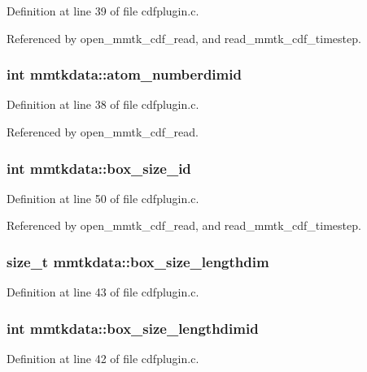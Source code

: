 Definition at line 39 of file cdfplugin.c.

Referenced by open\_\-mmtk\_\-cdf\_\-read, and read\_\-mmtk\_\-cdf\_\-timestep.
\subsubsection{\setlength{\rightskip}{0pt plus 5cm}int mmtkdata::atom\_\-numberdimid}\label{structmmtkdata_m4}




Definition at line 38 of file cdfplugin.c.

Referenced by open\_\-mmtk\_\-cdf\_\-read.
\subsubsection{\setlength{\rightskip}{0pt plus 5cm}int mmtkdata::box\_\-size\_\-id}\label{structmmtkdata_m16}




Definition at line 50 of file cdfplugin.c.

Referenced by open\_\-mmtk\_\-cdf\_\-read, and read\_\-mmtk\_\-cdf\_\-timestep.
\subsubsection{\setlength{\rightskip}{0pt plus 5cm}size\_\-t mmtkdata::box\_\-size\_\-lengthdim}\label{structmmtkdata_m9}




Definition at line 43 of file cdfplugin.c.
\subsubsection{\setlength{\rightskip}{0pt plus 5cm}int mmtkdata::box\_\-size\_\-lengthdimid}\label{structmmtkdata_m8}




Definition at line 42 of file cdfplugin.c.
